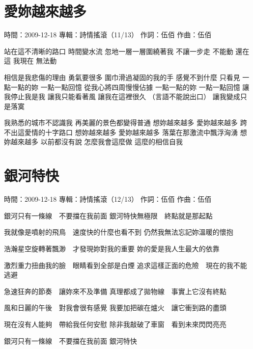 \documentclass[UTF8,a4paper,oneside,twocolumn,12pt]{ctexbook}
\newcommand{\infopair}[2]{\textbullet #1：#2}
\newcommand{\zc}[1][伍佰]{\infopair{作詞}{#1}}
\newcommand{\zq}[1][伍佰]{\infopair{作曲}{#1}}
\newcommand{\zj}[1]{\infopair{專輯}{#1}}
\newcommand{\sj}[1]{\infopair{時間}{#1}}
\newenvironment{info}{\begin{flushleft}\kaishu
	}
	{\end{flushleft}\normalsize\yahei\par}
\newenvironment{lyric}{
	}
{}
\begin{document}
\section{愛妳越來越多}
\begin{info}
	\sj{2009-12-18}
	\zj{詩情搖滾（11/13）}
	\zc
	\zq
\end{info}
\begin{lyric}
	站在這不清晰的路口 時間變水流
	忽地一層一層圍繞著我 不讓一步走
	不能動 還在這 我現在 無法動

	相信是我悲傷的理由 勇氣要很多
	圍巾滑過凝固的我的手 感覺不到什麼
	只看見 一點一點的妳 一點一點回憶
	從我心將四周慢慢佔據
	一點一點的妳 一點一點回憶
	讓我停止我是我 讓我只能看著風
	讓我在這裡很久 （言語不能說出口） 讓我變成只是落寞

	我熟悉的城市不認識我
	再美麗的景色都變得普通
	想妳越來越多 愛妳越來越多
	跨不出這愛情的十字路口
	想妳越來越多 愛妳越來越多
	落葉在那激流中飄浮洶湧
	想妳越來越多 以前都沒有說
	怎麼我會這麼做 這麼的相信自我
\end{lyric}

\section{銀河特快}
\begin{info}
	\sj{2009-12-18}
	\zj{詩情搖滾（12/13）}
	\zc
	\zq
\end{info}
\begin{lyric}
	銀河只有一條線　不要擋在我前面
	銀河特快無極限　終點就是那起點

	我就像是噴射的飛鳥　速度快的什麼也看不到
	仍然我無法忘記妳溫暖的懷抱

	浩瀚星空旋轉著飄渺　才發現妳對我的重要
	妳的愛是我人生最大的依靠

	激烈重力扭曲我的臉　眼睛看到全部是白煙
	追求這樣正面的危險　現在的我不能逃避

	急速狂奔的節奏　讓妳來不及準備
	真理都成了拋物線　事實上它沒有終點

	風和日麗的午後　對我會很有感覺
	我要加把碳在爐火　讓它衝到路的盡頭

	現在沒有人能夠　帶給我任何安慰
	除非我敲破了車窗　看到未來閃閃亮亮

	銀河只有一條線　不要擋在我前面 銀河特快
\end{lyric}
\end{document}

